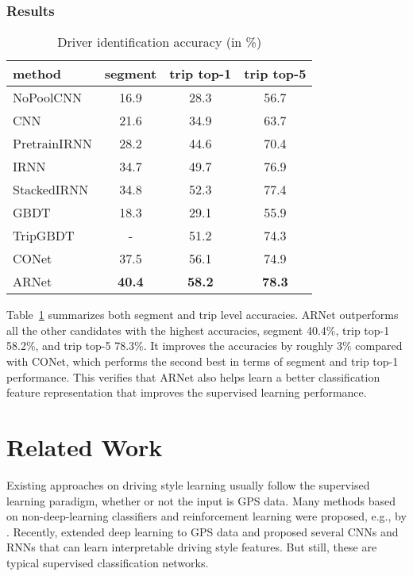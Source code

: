 \documentclass{article}
\begin{document}
\subsubsection{Results}

\begin{table}[tb]
\caption{Driver identification accuracy (in \%)}\label{tab:driveridentification}
\centering  %
\tiny
\begin{tabular}{l|c|c|c}  %
\hline
method &segment &trip top-1 &trip top-5\\
\hline%
NoPoolCNN &16.9 &28.3 &56.7\\
CNN &21.6 &34.9 &63.7\\
PretrainIRNN &28.2 &44.6 &70.4 \\
IRNN &34.7 &49.7 &76.9\\
StackedIRNN &{34.8} &{52.3} &{77.4}\\
GBDT &18.3 &29.1 &55.9\\
TripGBDT &- &51.2 &74.3\\
CONet & 37.5 & 56.1 & 74.9\\
ARNet & \textbf{40.4} & \textbf{58.2} & \textbf{78.3}\\
\hline
\end{tabular}
\vspace{-0.1in}
\end{table}

Table~\ref{tab:driveridentification} summarizes both segment and trip level accuracies.
ARNet outperforms all the other candidates with the highest accuracies, segment 40.4\%, trip top-1 58.2\%, and trip top-5 78.3\%.
It improves the accuracies by roughly 3\% compared with CONet, which performs the second best in terms of segment and trip top-1 performance.
This verifies that ARNet also helps learn a better classification feature representation that improves the supervised learning performance.


\section{Related Work}
Existing approaches on driving style learning usually follow the supervised learning paradigm, whether or not the input is GPS data.
Many methods based on non-deep-learning classifiers and reinforcement learning were proposed, e.g., by \cite{lopez2012driver,quintero2012,quek2013driver,van2013driver,kuderer2015learning}.
Recently, \cite{dong2016characterizing} extended deep learning to GPS data and proposed several CNNs and RNNs that can learn interpretable driving style features. But still, these are typical supervised classification networks.
\end{document}

